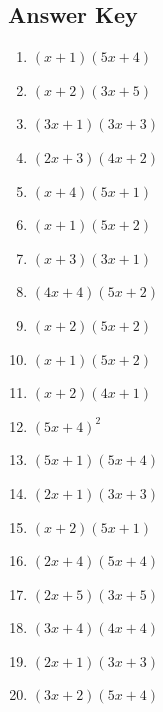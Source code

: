 \documentclass{article}
\begin{document}
\newpage

\subsection*{Answer Key}

\begin{enumerate}
\item $\displaystyle \left(x + 1\right) \left(5 x + 4\right) $ \ 
\item $\displaystyle \left(x + 2\right) \left(3 x + 5\right) $ \ 
\item $\displaystyle \left(3 x + 1\right) \left(3 x + 3\right) $ \ 
\item $\displaystyle \left(2 x + 3\right) \left(4 x + 2\right) $ \ 
\item $\displaystyle \left(x + 4\right) \left(5 x + 1\right) $ \ 
\item $\displaystyle \left(x + 1\right) \left(5 x + 2\right) $ \ 
\item $\displaystyle \left(x + 3\right) \left(3 x + 1\right) $ \ 
\item $\displaystyle \left(4 x + 4\right) \left(5 x + 2\right) $ \ 
\item $\displaystyle \left(x + 2\right) \left(5 x + 2\right) $ \ 
\item $\displaystyle \left(x + 1\right) \left(5 x + 2\right) $ \ 
\item $\displaystyle \left(x + 2\right) \left(4 x + 1\right) $ \ 
\item $\displaystyle \left(5 x + 4\right)^{2} $ \ 
\item $\displaystyle \left(5 x + 1\right) \left(5 x + 4\right) $ \ 
\item $\displaystyle \left(2 x + 1\right) \left(3 x + 3\right) $ \ 
\item $\displaystyle \left(x + 2\right) \left(5 x + 1\right) $ \ 
\item $\displaystyle \left(2 x + 4\right) \left(5 x + 4\right) $ \ 
\item $\displaystyle \left(2 x + 5\right) \left(3 x + 5\right) $ \ 
\item $\displaystyle \left(3 x + 4\right) \left(4 x + 4\right) $ \ 
\item $\displaystyle \left(2 x + 1\right) \left(3 x + 3\right) $ \ 
\item $\displaystyle \left(3 x + 2\right) \left(5 x + 4\right) $ \ 

\end{enumerate}
\end{document}
